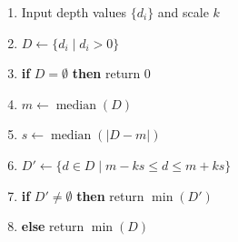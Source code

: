 \begin{enumerate}
    \item Input depth values $\{d_i\}$ and scale $k$
    \item $D \gets \{d_i\mid d_i>0\}$
    \item\textbf{if} $D=\emptyset$ \textbf{then} return $0$
    \item $m \gets \operatorname{median}(D)$
    \item $s \gets \operatorname{median}(|D-m|)$
    \item $D' \gets \{d\in D\mid m-k s \le d \le m+k s\}$
    \item\textbf{if} $D'\neq\emptyset$ \textbf{then} return $\min(D')$
    \item\textbf{else} return $\min(D)$
\end{enumerate}

